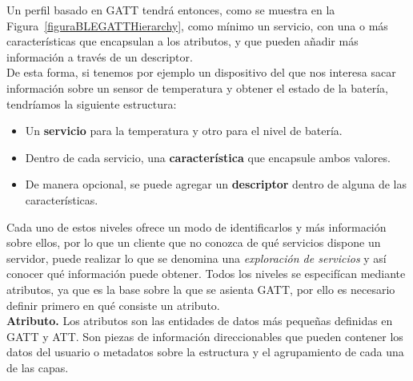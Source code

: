 Un perfil basado en GATT tendrá entonces, como se muestra en la Figura~\ref{figuraBLEGATTHierarchy}, como mínimo un servicio, con una o más características que encapsulan a los atributos, y que pueden añadir más información a través de un descriptor.\\
De esta forma, si tenemos por ejemplo un dispositivo del que nos interesa sacar información sobre un sensor de temperatura y obtener el estado de la batería, tendríamos la siguiente estructura:
\begin{itemize}
	\item Un \textbf{servicio} para la temperatura y otro para el nivel de batería.
	\item Dentro de cada servicio, una \textbf{característica} que encapsule ambos valores.
	\item De manera opcional, se puede agregar un \textbf{descriptor} dentro de alguna de las características.
\end{itemize}
Cada uno de estos niveles ofrece un modo de identificarlos y más información sobre ellos, por lo que un cliente que no conozca de qué servicios dispone un servidor, puede realizar lo que se denomina una \textit{exploración de servicios} y así conocer qué información puede obtener. Todos los niveles se especifícan mediante atributos, ya que es la base sobre la que se asienta GATT, por ello es necesario definir primero en qué consiste un atributo.\\

\textbf{Atributo.} Los atributos son las entidades de datos más pequeñas definidas en GATT y ATT. Son piezas de información direccionables que pueden contener los datos del usuario o metadatos sobre la estructura y el agrupamiento de cada una de las capas.

